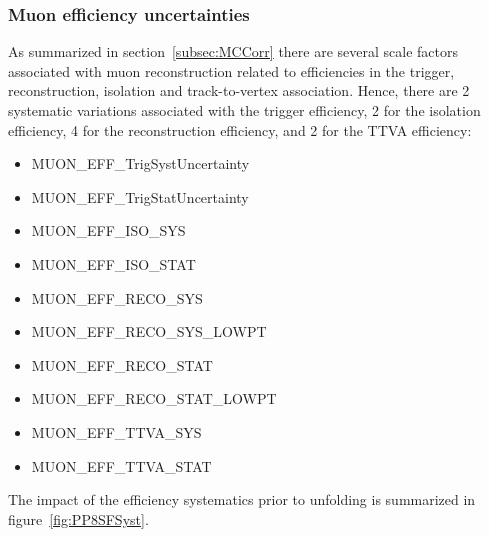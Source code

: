 \subsubsection{Muon efficiency uncertainties}
As summarized in section~\ref{subsec:MCCorr} there are several scale factors associated with muon reconstruction related to efficiencies in the trigger, reconstruction, isolation and track-to-vertex association.
Hence, there are 2 systematic variations associated with the trigger efficiency, 2 for the isolation efficiency, 4 for the reconstruction efficiency, and 2 for the TTVA efficiency:
\begin{itemize}
  \setlength{\itemsep}{1pt}\setlength{\parskip}{0pt}\setlength{\parsep}{0pt}
  \item MUON\_EFF\_TrigSystUncertainty
  \item MUON\_EFF\_TrigStatUncertainty
  \item MUON\_EFF\_ISO\_SYS
  \item MUON\_EFF\_ISO\_STAT
  \item MUON\_EFF\_RECO\_SYS
  \item MUON\_EFF\_RECO\_SYS\_LOWPT
  \item MUON\_EFF\_RECO\_STAT
  \item MUON\_EFF\_RECO\_STAT\_LOWPT
  \item MUON\_EFF\_TTVA\_SYS
  \item MUON\_EFF\_TTVA\_STAT
\end{itemize}

The impact of the efficiency systematics prior to unfolding is summarized in figure~\ref{fig:PP8SFSyst}.

